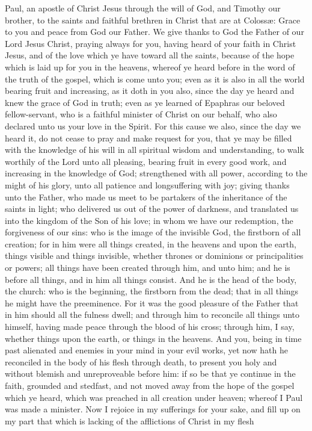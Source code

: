


Paul, an apostle of Christ Jesus through the will of God, and Timothy our brother, to the saints and faithful brethren in Christ that are at Colossæ: Grace to you and peace from God our Father.  We give thanks to God the Father of our Lord Jesus Christ, praying always for you, having heard of your faith in Christ Jesus, and of the love which ye have toward all the saints, because of the hope which is laid up for you in the heavens, whereof ye heard before in the word of the truth of the gospel, which is come unto you; even as it is also in all the world bearing fruit and increasing, as it doth in you also, since the day ye heard and knew the grace of God in truth; even as ye learned of Epaphras our beloved fellow-servant, who is a faithful minister of Christ on our behalf, who also declared unto us your love in the Spirit.  For this cause we also, since the day we heard it, do not cease to pray and make request for you, that ye may be filled with the knowledge of his will in all spiritual wisdom and understanding, to walk worthily of the Lord unto all pleasing, bearing fruit in every good work, and increasing in the knowledge of God; strengthened with all power, according to the might of his glory, unto all patience and longsuffering with joy; giving thanks unto the Father, who made us meet to be partakers of the inheritance of the saints in light; who delivered us out of the power of darkness, and translated us into the kingdom of the Son of his love; in whom we have our redemption, the forgiveness of our sins: who is the image of the invisible God, the firstborn of all creation; for in him were all things created, in the heavens and upon the earth, things visible and things invisible, whether thrones or dominions or principalities or powers; all things have been created through him, and unto him; and he is before all things, and in him all things consist. And he is the head of the body, the church: who is the beginning, the firstborn from the dead; that in all things he might have the preeminence. For it was the good pleasure of the Father that in him should all the fulness dwell; and through him to reconcile all things unto himself, having made peace through the blood of his cross; through him, I say, whether things upon the earth, or things in the heavens. And you, being in time past alienated and enemies in your mind in your evil works, yet now hath he reconciled in the body of his flesh through death, to present you holy and without blemish and unreproveable before him: if so be that ye continue in the faith, grounded and stedfast, and not moved away from the hope of the gospel which ye heard, which was preached in all creation under heaven; whereof I Paul was made a minister.  Now I rejoice in my sufferings for your sake, and fill up on my part that which is lacking of the afflictions of Christ in my flesh 